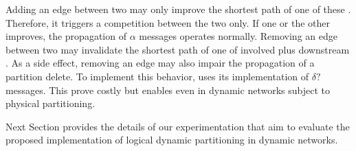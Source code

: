 Adding an edge between two \processes may only improve the shortest
path of one of these \processes. Therefore, it triggers a competition
between the two \processes only. If one or the other \process
improves, the propagation of $\alpha$ messages operates normally.
Removing an edge between two \processes may invalidate the shortest
path of one of involved \processes plus downstream \processes. As a
side effect, removing an edge may also impair the propagation of a
partition delete. To implement this behavior, \NAME uses its
implementation of $\delta?$ messages. This prove costly but
enables \NAME even in dynamic networks subject to physical
partitioning.

Next Section provides the details of our experimentation that aim to
evaluate the proposed implementation of logical dynamic partitioning
in dynamic networks.

